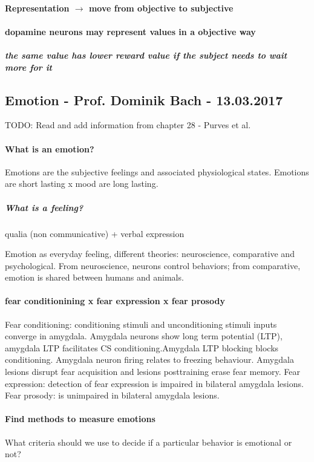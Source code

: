\documentclass[12pt,article,oneside,a4paper]{memoir}
\begin{document}
\paragraph{Representation $\rightarrow$ move from objective to subjective}
\paragraph{dopamine neurons may represent values in a objective way}
\subparagraph{the same value has lower reward value if the subject needs to wait more for it}

\newpage
\subsection{Emotion - Prof. Dominik Bach - 13.03.2017}

TODO: Read and add information from chapter 28 - Purves et al.

\paragraph{What is an emotion?} Emotions are the subjective feelings and associated physiological states. Emotions are short lasting x mood are long lasting.
\subparagraph{What is a feeling?} qualia (non communicative) + verbal expression

Emotion as everyday feeling, different theories: neuroscience, comparative and psychological. From neuroscience, neurons control behaviors; from comparative, emotion is shared between humans and animals.

\paragraph{fear conditionining x fear expression x fear prosody}
Fear conditioning: conditioning stimuli and unconditioning stimuli inputs converge in amygdala. Amygdala neurons show long term potential (LTP), amygdala LTP facilitates CS conditioning.Amygdala LTP blocking blocks conditioning. Amygdala neuron firing relates to freezing behaviour. Amygdala lesions disrupt fear acquisition and lesions posttraining erase fear memory.
Fear expression: detection of fear expression is impaired in bilateral amygdala lesions.
Fear prosody: is unimpaired in bilateral amygdala lesions.

\paragraph{Find methods to measure emotions} What criteria should we use to decide if a particular behavior is emotional or not?
\end{document}
